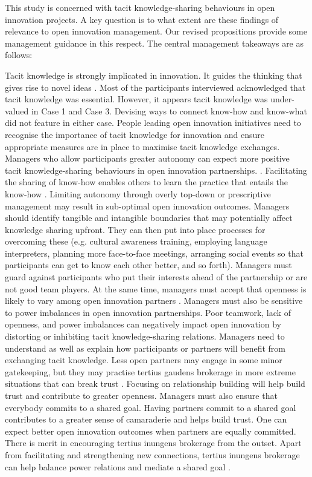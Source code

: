 This study is concerned with tacit knowledge-sharing behaviours in open innovation projects. A key question is to what extent are these findings of relevance to open innovation management. Our revised propositions provide some management guidance in this respect. The central management takeaways are as follows: 

\noindent
Tacit knowledge is strongly implicated in innovation. It guides the thinking that gives rise to novel ideas \citep{leonard1998role,lam2000tacit,senker2008contribution}. Most of the participants interviewed acknowledged that tacit knowledge was essential. However, it appears tacit knowledge was under-valued in Case 1 and Case 3. Devising ways to connect know-how and know-what did not feature in either case. People leading open innovation initiatives need to recognise the importance of tacit knowledge for innovation and ensure appropriate measures are in place to maximise tacit knowledge exchanges.\medskip
\noindent
Managers who allow participants greater autonomy can expect more positive tacit knowledge-sharing behaviours in open innovation partnerships. \citep{gagne2005self,gagne2009model,longo2017struggling}. Facilitating the sharing of know-how enables others to learn the practice that entails the know-how \citep{cook1999bridging}. Limiting autonomy through overly top-down or prescriptive management may result in sub-optimal open innovation outcomes.\medskip
\noindent
Managers should identify tangible and intangible boundaries that may potentially affect knowledge sharing upfront. They can then put into place processes for overcoming these (e.g. cultural awareness training, employing language interpreters, planning more face-to-face meetings, arranging social events so that participants can get to know each other better, and so forth). Managers must guard against participants who put their interests ahead of the partnership or are not good team players. At the same time, managers must accept that openness is likely to vary among open innovation partners \citep{dahlander2010open}. Managers must also be sensitive to power imbalances in open innovation partnerships. Poor teamwork, lack of openness, and power imbalances can negatively impact open innovation by distorting or inhibiting tacit knowledge-sharing relations.\medskip
\noindent
Managers need to understand as well as explain how participants or partners will benefit from exchanging tacit knowledge. Less open partners may engage in some minor gatekeeping, but they may practise tertius gaudens brokerage in more extreme situations that can break trust \citep{obstfeld2014brokerage}. Focusing on relationship building will help build trust and contribute to greater openness. Managers must also ensure that everybody commits to a shared goal. Having partners commit to a shared goal contributes to a greater sense of camaraderie and helps build trust. One can expect better open innovation outcomes when partners are equally committed. There is merit in encouraging tertius inungens brokerage from the outset. Apart from facilitating and strengthening new connections, tertius inungens brokerage can help balance power relations and mediate a shared goal \citep{chesbrough2012open}.\medskip
